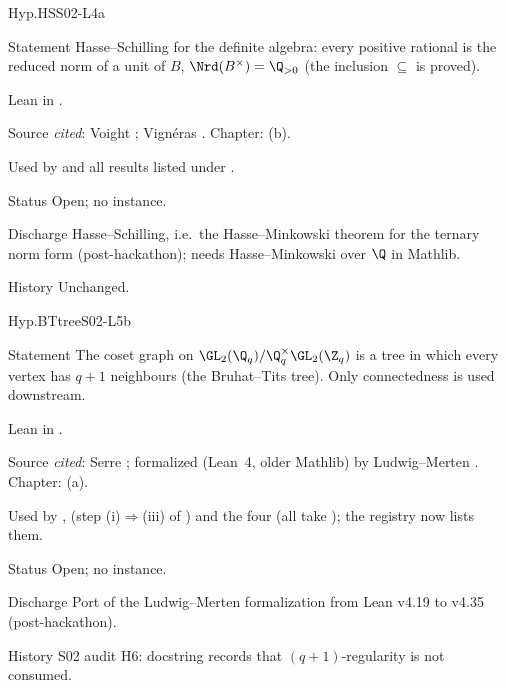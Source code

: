 \begin{hypentry}{Hyp.HS}{\kindlit}{S02-L4a}
\item[Statement] Hasse--Schilling for the definite algebra: every positive rational is the reduced norm of a unit of
  $B$, $\Nrd(B^\times)=\Q_{>0}$ (the inclusion $\subseteq$ is proved).
\item[Lean]  in .
\item[Source] \emph{cited}: Voight \cite[Main Thm.~14.7.4]{Vo}; Vign\'eras \cite[III.4.1]{Vigneras1980}. Chapter:
  (b).
\item[Used by]  and all  results listed under .
\item[Status] Open; no instance.
\item[Discharge] Hasse--Schilling, i.e.\ the Hasse--Minkowski theorem for the ternary norm form (post-hackathon);
  needs Hasse--Minkowski over $\Q$ in Mathlib.
\item[History] Unchanged.
\end{hypentry}

\begin{hypentry}{Hyp.BTtree}{\kindlit}{S02-L5b}
\item[Statement] The coset graph on $\GL_2(\Q_q)/\Q_q^\times\GL_2(\Z_q)$ is a tree in which every vertex has $q+1$
  neighbours (the Bruhat--Tits tree). Only connectedness is used downstream.
\item[Lean]  in
  .
\item[Source] \emph{cited}: Serre \cite[II.1.1, Thm.~1]{Se}; formalized (Lean~4, older Mathlib) by Ludwig--Merten
  \cite{LM}. Chapter: (a).
\item[Used by] ,  (step (i)$\Rightarrow$(iii) of
  ) and the four  (all take ); the registry now lists them.
\item[Status] Open; no instance.
\item[Discharge] Port of the Ludwig--Merten formalization from Lean v4.19 to v4.35 (post-hackathon).
\item[History] S02 audit H6: docstring records that $(q+1)$-regularity is not consumed.
\end{hypentry}

